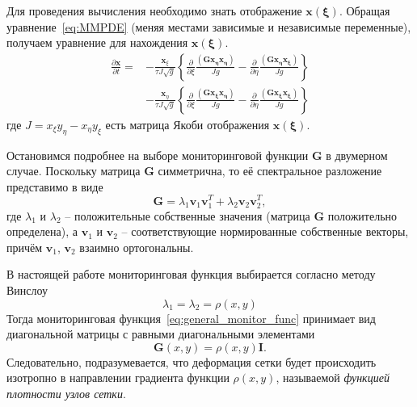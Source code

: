 Для проведения вычисления необходимо знать отображение  $ \mathbf{x}( \boldsymbol\xi)$. Обращая уравнение~\eqref{eq:MMPDE} (меняя местами зависимые и независимые переменные), получаем уравнение для нахождения  $ \mathbf{x}( \boldsymbol\xi)$.
\begin{equation}
\begin{split}
\frac{\partial \mathbf{x}}{\partial t} = 
& - \frac{\mathbf{x}_{\xi}}{\tau J \sqrt{g}}
\left\{ 
	\frac{\partial}{\partial \xi}    \frac{\left(\mathbf{G x_{\eta}x_{\eta}}\right)}{Jg} - 
	\frac{\partial}{\partial \eta} \frac{\left(\mathbf{G x_{\eta}x_{\xi}}   \right)}{Jg} 
\right\}\\
& - \frac{\mathbf{x}_{\eta}}{\tau J \sqrt{g}}
\left\{ 
\frac{\partial}{\partial \xi}    \frac{\left(\mathbf{G x_{\xi}x_{\eta}}\right)}{Jg} - 
\frac{\partial}{\partial \eta} \frac{\left(\mathbf{G x_{\xi}x_{\xi}}   \right)}{Jg} 
\right\}
\end{split}
\end{equation}
где  $J = x_{\xi}y_{\eta} - x_{\eta}y_{\xi}$ есть матрица Якоби отображения $\mathbf{x}(\boldsymbol\xi)$.

Остановимся подробнее на выборе мониторинговой функции $\mathbf{G}$  в двумерном случае. Поскольку матрица $\mathbf{G}$ симметрична, то её спектральное разложение представимо в виде 
\begin{equation}
\mathbf{G} = \lambda_1\mathbf{v}_1\mathbf{v}_1^T + \lambda_2\mathbf{v}_2\mathbf{v}_2^T,
\label{eq:general_monitor_func} 
\end{equation}
где $\lambda_1$ и $\lambda_2$ – положительные собственные значения (матрица $\mathbf{G}$  положительно определена), а $\mathbf{v}_1$  и $\mathbf{v}_2$  – соответствующие нормированные собственные векторы, причём  $\mathbf{v}_1$, $\mathbf{v}_2$  взаимно ортогональны.

В настоящей работе мониторинговая функция выбирается согласно методу Винслоу~\cite{winslow_adaptive-mesh_1981}
\begin{equation}
\lambda_1 = \lambda_2 = \rho(x,y)
\end{equation}
Тогда мониторинговая функция~\eqref{eq:general_monitor_func} принимает вид диагональной матрицы с равными диагональными элементами
\begin{equation}
\mathbf{G}(x,y) = \rho(x,y)\mathbf{I}.
\label{eq:monitor_func} 
\end{equation}
Следовательно, подразумевается, что деформация сетки будет происходить изотропно в направлении градиента функции $ \rho(x,y)$, называемой \textit{функцией плотности узлов сетки}.


